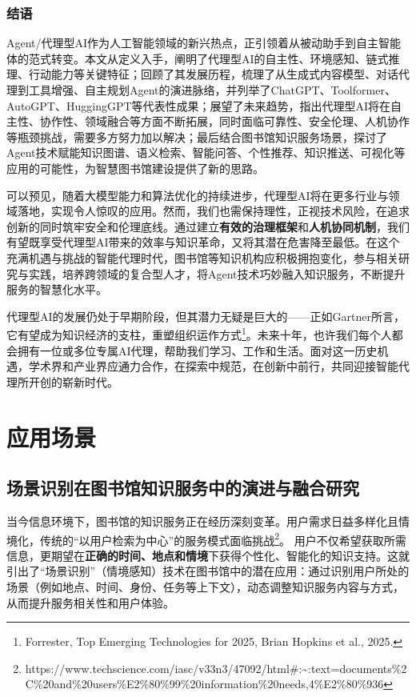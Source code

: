 \documentclass[
  letterpaper,
]{scrbook}
\begin{document}
\section{结语}\label{ux7ed3ux8bed}

Agent/代理型AI作为人工智能领域的新兴热点，正引领着从被动助手到自主智能体的范式转变。本文从定义入手，阐明了代理型AI的自主性、环境感知、链式推理、行动能力等关键特征；回顾了其发展历程，梳理了从生成式内容模型、对话代理到工具增强、自主规划Agent的演进脉络，并列举了ChatGPT、Toolformer、AutoGPT、HuggingGPT等代表性成果；展望了未来趋势，指出代理型AI将在自主性、协作性、领域融合等方面不断拓展，同时面临可靠性、安全伦理、人机协作等瓶颈挑战，需要多方努力加以解决；最后结合图书馆知识服务场景，探讨了Agent技术赋能知识图谱、语义检索、智能问答、个性推荐、知识推送、可视化等应用的可能性，为智慧图书馆建设提供了新的思路。

可以预见，随着大模型能力和算法优化的持续进步，代理型AI将在更多行业与领域落地，实现令人惊叹的应用。然而，我们也需保持理性，正视技术风险，在追求创新的同时筑牢安全和伦理底线。通过建立\textbf{有效的治理框架}和\textbf{人机协同机制}，我们有望既享受代理型AI带来的效率与知识革命，又将其潜在危害降至最低。在这个充满机遇与挑战的智能代理时代，图书馆等知识机构应积极拥抱变化，参与相关研究与实践，培养跨领域的复合型人才，将Agent技术巧妙融入知识服务，不断提升服务的智慧化水平。

代理型AI的发展仍处于早期阶段，但其潜力无疑是巨大的------正如Gartner所言，它有望成为知识经济的支柱，重塑组织运作方式\footnote{Forrester,
  Top Emerging Technologies for 2025, Brian Hopkins et al., 2025.}。未来十年，也许我们每个人都会拥有一位或多位专属AI代理，帮助我们学习、工作和生活。面对这一历史机遇，学术界和产业界应通力合作，在探索中规范，在创新中前行，共同迎接智能代理所开创的崭新时代。

\part{应用场景}

\chapter{场景识别在图书馆知识服务中的演进与融合研究}\label{sec-scene-recognition}

当今信息环境下，图书馆的知识服务正在经历深刻变革。用户需求日益多样化且情境化，传统的``以用户检索为中心''的服务模式面临挑战\footnote{https://www.techscience.com/iasc/v33n3/47092/html\#:\textasciitilde:text=documents\%2C\%20and\%20users\%E2\%80\%99\%20information\%20needs,4\%E2\%80\%936}。
用户不仅希望获取所需信息，更期望在\textbf{正确的时间、地点和情境}下获得个性化、智能化的知识支持。这就引出了``场景识别''（情境感知）技术在图书馆中的潜在应用：通过识别用户所处的场景（例如地点、时间、身份、任务等上下文），动态调整知识服务内容与方式，从而提升服务相关性和用户体验。
\end{document}
